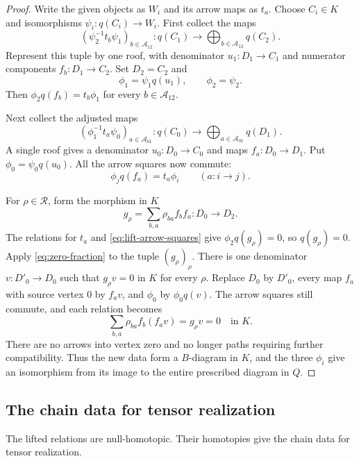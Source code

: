 \documentclass[11pt]{article}
\numberwithin{equation}{section}
\theoremstyle{definition}
\theoremstyle{remark}
\begin{document}
\begin{proof}
Write the given objects as $W_i$ and its arrow maps as $t_a$.
Choose $C_i\in K$ and isomorphisms $\psi_i:q(C_i)\to W_i$.
First collect the maps
\[
  (\psi_2^{-1}t_b\psi_1)_{b\in\mathcal A_{12}}:
     q(C_1)\longrightarrow
     \bigoplus_{b\in\mathcal A_{12}}q(C_2).
\]
Represent this tuple by one roof, with denominator
$u_1:D_1\to C_1$ and numerator components $f_b:D_1\to C_2$.
Set $D_2=C_2$ and
\[
  \phi_1=\psi_1q(u_1),\qquad \phi_2=\psi_2.
\]
Then $\phi_2q(f_b)=t_b\phi_1$ for every $b\in\mathcal A_{12}$.

Next collect the adjusted maps
\[
  (\phi_1^{-1}t_a\psi_0)_{a\in\mathcal A_{01}}:
     q(C_0)\longrightarrow
     \bigoplus_{a\in\mathcal A_{01}}q(D_1).
\]
A single roof gives a denominator $u_0:D_0\to C_0$ and maps
$f_a:D_0\to D_1$.  Put $\phi_0=\psi_0q(u_0)$.
All the arrow squares now commute:
\begin{equation}\label{eq:lift-arrow-squares}
  \phi_jq(f_a)=t_a\phi_i\qquad(a:i\to j).
\end{equation}

For $\rho\in\mathcal R$, form the morphism in $K$
\[
  g_\rho=\sum_{b,a}\rho_{ba}f_bf_a:D_0\longrightarrow D_2.
\]
The relations for $t_a$ and \eqref{eq:lift-arrow-squares} give
$\phi_2q(g_\rho)=0$, so $q(g_\rho)=0$.
Apply \eqref{eq:zero-fraction} to the tuple $(g_\rho)_\rho$.
There is one denominator $v:D'_0\to D_0$ such that
$g_\rho v=0$ in $K$ for every $\rho$.
Replace $D_0$ by $D'_0$, every map $f_a$ with source vertex $0$ by
$f_av$, and $\phi_0$ by $\phi_0q(v)$.
The arrow squares still commute, and each relation becomes
\[
  \sum_{b,a}\rho_{ba}f_b(f_av)=g_\rho v=0
  \quad\text{in }K.
\]
There are no arrows into vertex zero and no longer paths requiring
further compatibility.  Thus the new data form a $B$-diagram in $K$,
and the three $\phi_i$ give an isomorphism from its image to the
entire prescribed diagram in $Q$.
\end{proof}

\subsection{The chain data for tensor realization}

The lifted relations are null-homotopic. Their homotopies give the
chain data for tensor realization.
\end{document}
